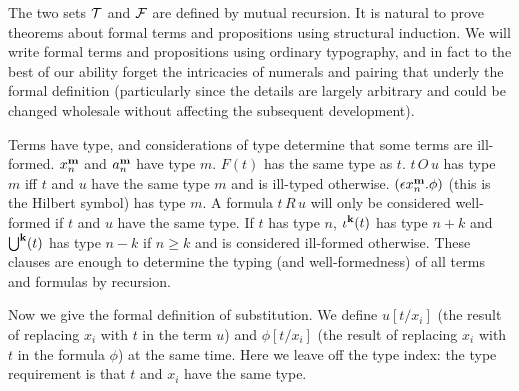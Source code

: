 \documentclass[12pt]{book}
\begin{document}
The two sets $\cal T$ and $\cal F$ are defined by mutual recursion.
It is natural to prove theorems about formal terms and propositions
using structural induction.  We will write formal terms and
propositions using ordinary typography, and in fact to the best of our
ability forget the intricacies of numerals and pairing that underly
the formal definition (particularly since the details are largely
arbitrary and could be changed wholesale without affecting the
subsequent development).

Terms have type, and considerations of type determine that some terms
are ill-formed.  $x^{\bf m}_n$ and $a^{\bf m}_n$ have type $m$.
$F(t)$ has the same type as $t$.  $t\,O\,u$ has type $m$ iff $t$ and
$u$ have the same type $m$ and is ill-typed otherwise.  $(\epsilon
x^{\bf m}_n.\phi)$ (this is the Hilbert symbol) has type $m$.  A
formula $t\,R\,u$ will only be considered well-formed if $t$ and $u$
have the same type.  If $t$ has type $n$, $\iota^{\bf k}(t)$ has type $n+k$
and $\bigcup^{\bf k}(t)$ has type $n-k$ if $n\geq k$ and is considered
ill-formed otherwise.  These clauses are enough to determine the typing
(and well-formedness) of all terms and formulas by recursion.

\newpage

Now we give the formal definition of substitution.  We define
$u[t/x_i]$ (the result of replacing $x_i$ with $t$ in the term $u$)
and $\phi[t/x_i]$ (the result of replacing $x_i$ with $t$ in the
formula $\phi$) at the same time.  Here we leave off the type index:
the type requirement is that $t$ and $x_i$ have the same type.
\end{document}
